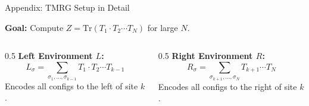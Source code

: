 \documentclass[aspectratio=169, 11pt]{beamer}
\begin{document}
\begin{frame}{Appendix: TMRG Setup in Detail}
    
    \textbf{Goal:} Compute $Z = \text{Tr}(T_1 \cdot T_2 \cdots T_N)$ for large $N$.
    
    \vspace{0.3cm}
    
    \begin{center}
    \end{center}
    
    \vspace{0.3cm}
    
    \begin{columns}
        \begin{column}{0.5\textwidth}
            \textbf{Left Environment $L$:}
            \[
            L_{\sigma} = \sum_{\sigma_1, \ldots, \sigma_{k-1}} T_1 \cdot T_2 \cdots T_{k-1}
            \]
            Encodes all configs to the left of site $k$.
        \end{column}
        \begin{column}{0.5\textwidth}
            \textbf{Right Environment $R$:}
            \[
            R_{\sigma} = \sum_{\sigma_{k+1}, \ldots, \sigma_N} T_{k+1} \cdots T_N
            \]
            Encodes all configs to the right of site $k$.
        \end{column}
    \end{columns}
\end{frame}
\end{document}
